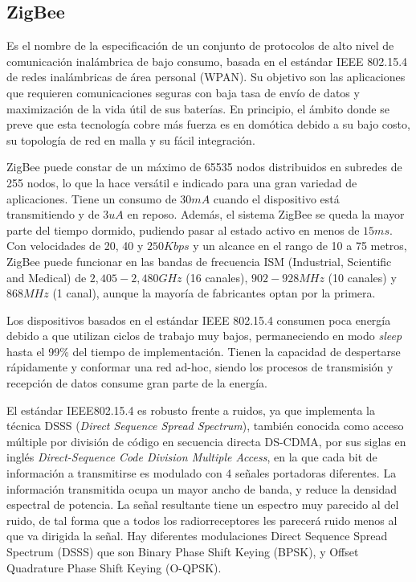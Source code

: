 \documentclass[conference,a4paper,9pt]{IEEEtran}
\begin{document}
\subsection{ZigBee}

Es el nombre de la especificación de un conjunto de protocolos de alto nivel de comunicación inalámbrica de bajo consumo, basada en el estándar IEEE 802.15.4 de redes inalámbricas de área personal (WPAN). Su objetivo son las aplicaciones que requieren comunicaciones seguras con baja tasa de envío de datos y maximización de la vida útil de sus baterías. En principio, el ámbito donde se preve que esta tecnología cobre más fuerza es en domótica debido a su bajo costo, su topología de red en malla y su fácil integración.

ZigBee puede constar de un máximo de 65535 nodos distribuidos en subredes de 255 nodos, lo que la hace versátil e indicado para una gran variedad de aplicaciones. Tiene un consumo de $30 mA$ cuando el dispositivo está transmitiendo y de $3uA$ en reposo. Además, el sistema ZigBee se queda la mayor parte del tiempo dormido, pudiendo pasar al estado activo en menos de $15 ms$. Con velocidades de 20, 40 y $250 Kbps$ y un alcance en el rango de 10 a 75 metros, ZigBee puede funcionar en las bandas de frecuencia ISM (Industrial, Scientific and Medical) de $2,405-2,480 GHz$ (16 canales), $902-928 MHz$ (10 canales) y $868MHz$ (1 canal), aunque la mayoría de fabricantes optan por la primera.

Los dispositivos basados en el estándar IEEE 802.15.4 consumen poca energía debido a que utilizan ciclos de trabajo muy bajos, permaneciendo en modo \textit{sleep} hasta el 99\% del tiempo de implementación. Tienen la capacidad de despertarse rápidamente y conformar una red ad-hoc, siendo los procesos de transmisión y recepción de datos consume gran parte de la energía.

El estándar IEEE802.15.4 es robusto frente a ruidos, ya que implementa la técnica DSSS (\textit{Direct Sequence Spread Spectrum}), también conocida como acceso múltiple por división de código en secuencia directa DS-CDMA, por sus siglas en inglés \textit{Direct-Sequence Code Division Multiple Access}, en la que cada bit de información a transmitirse es modulado con 4 señales portadoras diferentes. La información transmitida ocupa un mayor ancho de banda, y reduce la densidad espectral de potencia. La señal resultante tiene un espectro muy parecido al del ruido, de tal forma que a todos los radiorreceptores les parecerá ruido menos al que va dirigida la señal. Hay diferentes modulaciones Direct Sequence Spread Spectrum (DSSS) que son Binary Phase Shift Keying (BPSK), y Offset Quadrature Phase Shift Keying (O-QPSK).
\end{document}
